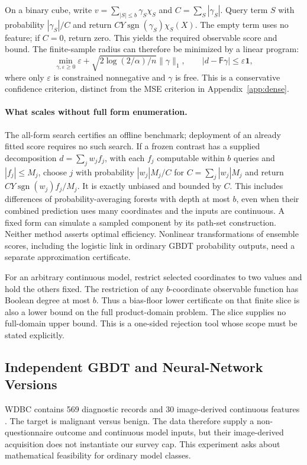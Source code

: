 On a binary cube, write $v=\sum_{|S|\le b}\gamma_S\chi_S$ and
$C=\sum_S|\gamma_S|$. Query term $S$ with probability $|\gamma_S|/C$ and
return $CY\operatorname{sgn}(\gamma_S)\chi_S(X)$. The empty term uses no
feature; if $C=0$, return zero. This yields the required observable score and bound. The
finite-sample radius can therefore be minimized by a linear program:
\[
 \min_{\gamma,\varepsilon\ge0}
 \varepsilon+\sqrt{2\log(2/\alpha)/n}\|\gamma\|_1,
 \qquad |d-\mathsf F\gamma|\le\varepsilon\mathbf1,
\]
where only $\varepsilon$ is constrained nonnegative and $\gamma$ is free.
This is a conservative confidence criterion, distinct from the MSE
criterion in Appendix~\ref{app:dense}.

\paragraph{What scales without full form enumeration.}
The all-form search certifies an offline benchmark; deployment of an
already fitted score requires no such search. If a frozen contrast has
a supplied decomposition $d=\sum_j w_j f_j$, with each $f_j$ computable
within $b$ queries and $|f_j|\le M_j$, choose $j$ with probability
$|w_j|M_j/C$ for $C=\sum_j|w_j|M_j$ and return
$CY\operatorname{sgn}(w_j)f_j/M_j$.
It is exactly unbiased and bounded by $C$. This includes differences of
probability-averaging forests with depth at most $b$, even when their
combined prediction uses many coordinates and the inputs are continuous.
A fixed form can simulate a sampled component by its path-set construction.
Neither method asserts optimal efficiency. Nonlinear transformations of
ensemble scores, including the logistic link in ordinary GBDT probability
outputs, need a separate approximation certificate.

For an arbitrary continuous model, restrict selected coordinates to two
values and hold the others fixed. The restriction of any $b$-coordinate
observable function has Boolean degree at most $b$. Thus a bias-floor
lower certificate on that finite slice is also a lower bound on the full
product-domain problem. The slice supplies no full-domain upper bound.
This is a one-sided rejection tool whose scope must be stated explicitly.

\subsection{Independent GBDT and Neural-Network Versions}\label{app:nonlinear}
WDBC contains 569 diagnostic records and 30 image-derived continuous
features \citep{wolberg1993}. The target is malignant versus benign.
The data therefore supply a non-questionnaire outcome and continuous
model inputs, but their image-derived acquisition does not instantiate
our survey cap. This experiment asks about mathematical feasibility for
ordinary model classes.

